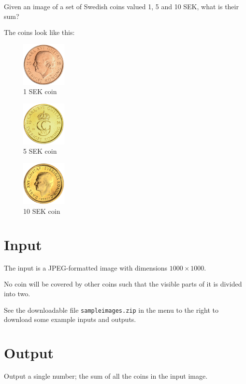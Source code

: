 Given an image of a set of Swedish coins valued 1, 5 and 10 SEK, what is their sum?

The coins look like this:
\begin{figure}[h]
  \centering
  \includegraphics[width=0.2\textwidth]{1.png}
  \caption{1 SEK coin}
\end{figure}
\begin{figure}[h]
  \centering
  \includegraphics[width=0.2\textwidth]{5.png}
  \caption{5 SEK coin}
\end{figure}
\begin{figure}[h]
  \centering
  \includegraphics[width=0.2\textwidth]{10.png}
  \caption{10 SEK coin}
\end{figure}

\section*{Input}
The input is a JPEG-formatted image with dimensions $1000 \times 1000$.

No coin will be covered by other coins such that the visible parts of it is divided into two.

See the downloadable file \texttt{sampleimages.zip} in the menu to the right to download some example inputs and outputs.

\section*{Output}
Output a single number; the sum of all the coins in the input image.

